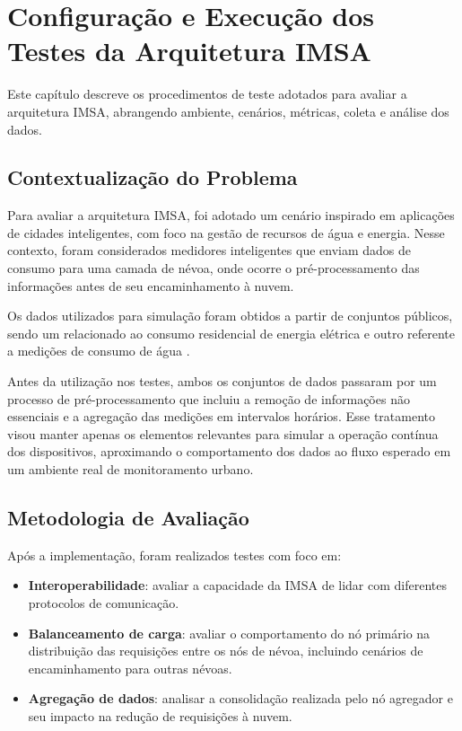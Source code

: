 \chapter{Configuração e Execução dos Testes da Arquitetura IMSA}\label{cap:testes}

Este capítulo descreve os procedimentos de teste adotados para avaliar a arquitetura \gls{IMSA}, abrangendo ambiente, cenários, métricas, coleta e análise dos dados.

\section{Contextualização do Problema}

Para avaliar a arquitetura \gls{IMSA}, foi adotado um cenário inspirado em aplicações de cidades inteligentes, com foco na gestão de recursos de água e energia. Nesse contexto, foram considerados medidores inteligentes que enviam dados de consumo para uma camada de névoa, onde ocorre o pré-processamento das informações antes de seu encaminhamento à nuvem.

Os dados utilizados para simulação foram obtidos a partir de conjuntos públicos, sendo um relacionado ao consumo residencial de energia elétrica \cite{uci_energy} e outro referente a medições de consumo de água \cite{greek_water}.

Antes da utilização nos testes, ambos os conjuntos de dados passaram por um processo de pré-processamento que incluiu a remoção de informações não essenciais e a agregação das medições em intervalos horários. Esse tratamento visou manter apenas os elementos relevantes para simular a operação contínua dos dispositivos, aproximando o comportamento dos dados ao fluxo esperado em um ambiente real de monitoramento urbano.

\section{Metodologia de Avaliação}

Após a implementação, foram realizados testes com foco em:
\begin{itemize}
    \item \textbf{Interoperabilidade}: avaliar a capacidade da \gls{IMSA} de lidar com diferentes protocolos de comunicação.
    \item \textbf{Balanceamento de carga}: avaliar o comportamento do nó primário na distribuição das requisições entre os nós de névoa, incluindo cenários de encaminhamento para outras névoas.
    \item \textbf{Agregação de dados}: analisar a consolidação realizada pelo nó agregador e seu impacto na redução de requisições à nuvem.
\end{itemize}


